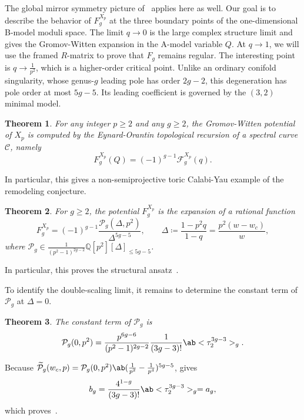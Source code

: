 \documentclass{amsart}
\newtheorem{thm}{Theorem}[section]
\theoremstyle{definition}
\theoremstyle{remark}
\theoremstyle{plain}
\theoremstyle{definition}
\theoremstyle{remark}
\newcommand{\Q}{\mathbb{Q}}
\newcommand{\mc}[1]{\mathcal{#1}}
\newcommand{\wt}[1]{\widetilde{#1}}
\newcommand{\1}{\mathbf{1}}
\newcommand{\2}{\mathbf{2}}
\newcommand{\3}{\mathbf{3}}
\begin{document}
The global mirror symmetry picture of~ applies here as well. Our goal is to describe the behavior of \(F_g^{X_p}\) at the three boundary points of the one-dimensional B-model moduli space. The limit \(q \to 0\) is the large complex structure limit and gives the Gromov-Witten expansion in the A-model variable \(Q\). At \(q \to 1\), we will use the framed \(R\)-matrix to prove that \(F_g\) remains regular. The interesting point is \(q \to \frac{1}{p^2}\), which is a higher-order critical point. Unlike an ordinary conifold singularity, whose genus-\(g\) leading pole has order \(2g-2\), this degeneration has pole order at most \(5g-5\). Its leading coefficient is governed by the \((3,2)\) minimal model.

\begin{thm}%
\label{thm:local P1 mirror symmetry}
    For any integer \(p \geq 2\) and any \(g \geq 2\), the Gromov-Witten potential of \(X_p\) is computed by the Eynard-Orantin topological recursion of a spectral curve \(\mc{C}\), namely
    \[ F_g^{X_p}(Q) = (-1)^{g-1}\mc{F}_g^{X_p}(q). \]
\end{thm}

In particular, this gives a non-semiprojective toric Calabi-Yau example of the remodeling conjecture.

\begin{thm}%
\label{thm:local P1 rationality}
    For \(g \geq 2\), the potential \(F_g^{X_p}\) is the expansion of a rational function
    \[ F_g^{X_p} = (-1)^{g-1}\frac{\mc{P}_g(\Delta,p^2)}{\Delta^{5g-5}}, \qquad \Delta \coloneqq \frac{1-p^2q}{1-q} = \frac{p^2(w-w_c)}{w}, \]
    where \(\mc{P}_g \in \frac{1}{(p^2-1)^{2g-2}}\Q[p^2][\Delta]_{\leq 5g-5}\).
\end{thm}

In particular, this proves the structural ansatz~.

To identify the double-scaling limit, it remains to determine the constant term of \(\mc{P}_g\) at \(\Delta = 0\).

\begin{thm}%
\label{thm:local P1 constant term}
    The constant term of \(\mc{P}_g\) is
    \[ \mc{P}_g(0,p^2) = \frac{p^{6g-6}}{(p^2-1)^{2g-2}}\frac{1}{(3g-3)!}\ab<\tau_2^{3g-3}>_g. \]
\end{thm}

Because \(\wt{\mc{P}}_g(w_c,p) = \mc{P}_g(0,p^2)\ab(\frac{1}{p^2}-\frac{1}{p^4})^{5g-5}\),  gives
\[ b_g = \frac{4^{1-g}}{(3g-3)!}\ab<\tau_2^{3g-3}>_g = a_g, \]
which proves~.
\end{document}
